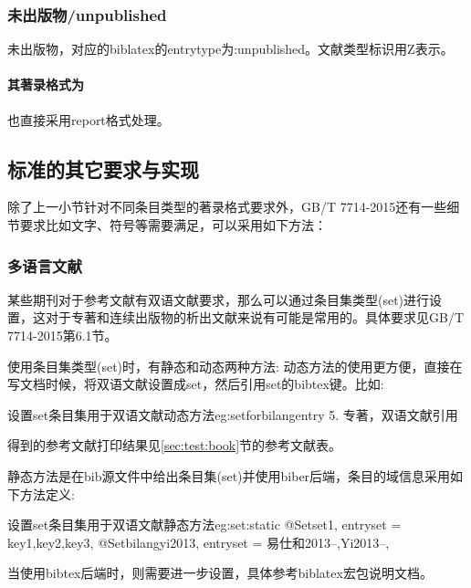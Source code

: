 \subsubsection{未出版物/unpublished}
\begin{refentry}{}{}
未出版物，对应的biblatex的entrytype为:unpublished。文献类型标识用Z表示。

\paragraph{其著录格式为} 也直接采用report格式处理。
\end{refentry}

\subsection{标准的其它要求与实现}

除了上一小节针对不同条目类型的著录格式要求外，GB/T 7714-2015还有一些细节要求比如文字、符号等需要满足，可以采用如下方法：

\subsubsection{多语言文献}

\begin{property}{}{}
某些期刊对于参考文献有双语文献要求，那么可以通过条目集类型(set)进行设置，这对于专著和连续出版物的析出文献来说有可能是常用的。具体要求见GB/T 7714-2015第6.1节。
\end{property}

使用条目集类型(set)时，有静态和动态两种方法:
动态方法的使用更方便，直接在写文档时候，将双语文献设置成set，然后引用set的bibtex键。比如:
\begin{codetex}{设置set条目集用于双语文献动态方法}{eg:setforbilangentry}
5. 专著，双语文献引用\cite{bilangyi2013}
\end{codetex}

得到的参考文献打印结果见\ref{sec:test:book}节的参考文献表。

静态方法是在bib源文件中给出条目集(set)并使用biber后端，条目的域信息采用如下方法定义:
\begin{codetex}{设置set条目集用于双语文献静态方法}{eg:set:static}
@Set{set1,
entryset = {key1,key2,key3},
}
@Set{bilangyi2013,
entryset = {易仕和2013--,Yi2013--},
}
\end{codetex}
当使用bibtex后端时，则需要进一步设置，具体参考biblatex宏包说明文档。


